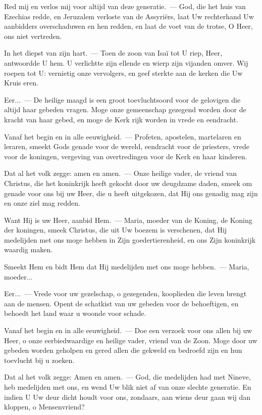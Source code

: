 \documentclass[12pt,twoside,a5paper]{article}
\begin{document}
\begin{halfparskip}
  Red mij en verlos mij voor altijd van deze generatie.~--- God, die het huis van Ezechias redde, en Jeruzalem verloste van de Assyriërs, laat Uw rechterhand Uw aanbidders overschaduwen en hen redden, en laat de voet van de trotse, O Heer, ons niet vertreden.

  In het diepst van zijn hart.~--- Toen de zoon van Isaï tot U riep, Heer, antwoordde U hem. U verlichtte zijn ellende en wierp zijn vijanden omver. Wij roepen tot U: vernietig onze vervolgers, en geef sterkte aan de kerken die Uw Kruis eren.

  Eer...~--- De heilige maagd is een groot toevluchtsoord voor de gelovigen die altijd haar gebeden vragen. Moge onze gemeenschap gezegend worden door de kracht van haar gebed, en moge de Kerk rijk worden in vrede en eendracht.

  Vanaf het begin en in alle eeuwigheid.~--- Profeten, apostelen, martelaren en leraren, smeekt Gods genade voor de wereld, eendracht voor de priesters, vrede voor de koningen, vergeving van overtredingen voor de Kerk en haar kinderen.

  Dat al het volk zegge: amen en amen.~--- Onze heilige vader, de vriend van Christus, die het koninkrijk heeft gekocht door uw deugdzame daden, smeek om genade voor ons bij uw Heer, die u heeft uitgekozen, dat Hij ons genadig mag zijn en onze ziel mag redden.
\end{halfparskip}


\begin{halfparskip}
  Want Hij is uw Heer, aanbid Hem.~--- Maria, moeder van de Koning, de Koning der koningen, smeek Christus, die uit Uw boezem is verschenen, dat Hij medelijden met ons moge hebben in Zijn goedertierenheid, en ons Zijn koninkrijk waardig maken.

  Smeekt Hem en bidt Hem dat Hij medelijden met ons moge hebben.~--- Maria, moeder...

  Eer...~--- Vrede voor uw gezelschap, o gezegenden, kooplieden die leven brengt aan de mensen. Opent de schatkist van uw gebeden voor de behoeftigen, en behoedt het land waar u woonde voor schade.

  Vanaf het begin en in alle eeuwigheid.~--- Doe een verzoek voor ons allen bij uw Heer, o onze eerbiedwaardige en heilige vader, vriend van de Zoon. Moge door uw gebeden worden geholpen en gered allen die gekweld en bedroefd zijn en hun toevlucht bij u zoeken.

  Dat al het volk zegge: Amen en amen.~--- God, die medelijden had met Nineve, heb medelijden met ons, en wend Uw blik niet af van onze slechte generatie. En indien U Uw deur dicht houdt voor ons, zondaars, aan wiens deur gaan wij dan kloppen, o Mensenvriend?
\end{halfparskip}
\end{document}
